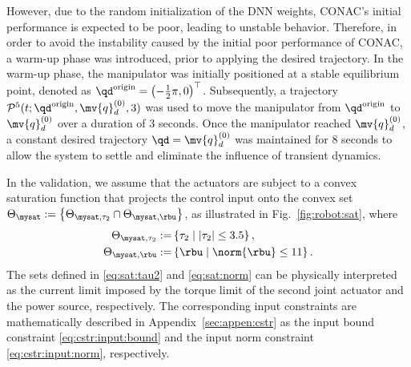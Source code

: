 \documentclass[letterpaper, journal]{IEEEtran}
\begin{document}
However, due to the random initialization of the DNN weights, CONAC's initial performance is expected to be poor, leading to unstable behavior.
Therefore, in order to avoid the instability caused by the initial poor performance of CONAC, a warm-up phase was introduced, prior to applying the desired trajectory.
In the warm-up phase, the manipulator was initially positioned at a stable equilibrium point, denoted as ${\qd}^{\rm{origin}} = \left(-\tfrac{1}{2}\pi, 0\right)^\top$.
Subsequently, a trajectory $\mathcal{P}^5(t; {\qd}^{\rm{origin}}, \mv{q}_d^{(0)},3)$ was used to move the manipulator from ${\qd}^{\rm{origin}}$ to $\mv{q}_d^{(0)}$ over a duration of 3 seconds.
Once the manipulator reached $\mv{q}_d^{(0)}$, a constant desired trajectory $\qd = \mv{q}_d^{(0)}$ was maintained for 8 seconds to allow the system to settle and eliminate the influence of transient dynamics.

In the validation, we assume that the actuators are subject to a convex saturation function that projects the control input onto the convex set 
$
    \Theta_{\mysat} :=\left\{ \Theta_{\mysat, {\tau_2}} \cap \Theta_{\mysat, {\rbu}} \right\}
$, as illustrated in Fig.~\ref{fig:robot:sat}, where
\begin{subequations}
    \begin{align}
        \Theta_{\mysat, {\tau_2}}
        :=&
        \left\{
            \tau_2
            \mid
            \vert{\tau_2}\vert \le 
            3.5
        \right\}
        ,
        \label{eq:sat:tau2}
        \\    
        \Theta_{\mysat, {\rbu}}
        :=&
        \left\{
            \rbu
            \mid
            \norm{\rbu} \le 
            11
        \right\}
        .
        \label{eq:sat:norm}
    \end{align}
    \label{eq:sat}%
\end{subequations}
The sets defined in \eqref{eq:sat:tau2} and \eqref{eq:sat:norm} can be physically interpreted as the current limit imposed by the torque limit of the second joint actuator and the power source, respectively.
The corresponding input constraints are mathematically described in Appendix~\ref{sec:appen:cstr} as the input bound constraint \eqref{eq:cstr:input:bound} and the input norm constraint \eqref{eq:cstr:input:norm}, respectively.
\end{document}
